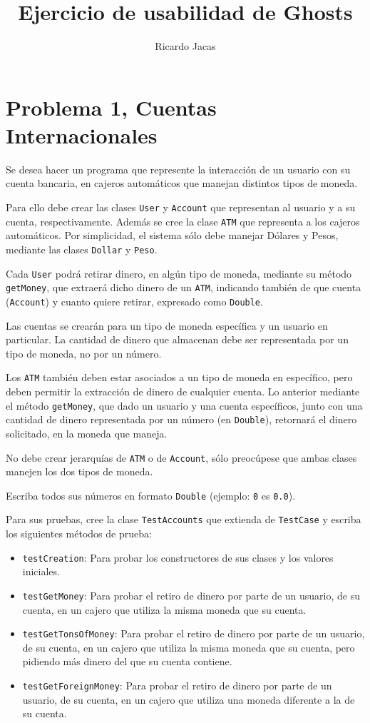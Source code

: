 \documentclass[11pt,spanish,letterpaper]{report}
\title{Ejercicio de usabilidad de Ghosts}
\author{Ricardo Jacas}
\begin{document}
\maketitle

\section*{Problema 1, Cuentas Internacionales}

Se desea hacer un programa que represente la interacción de un usuario con su cuenta bancaria, en cajeros automáticos que manejan distintos tipos de moneda.

Para ello debe crear las clases {\tt User} y {\tt Account} que representan al usuario y a su cuenta, respectivamente. Además se cree la clase {\tt ATM} que representa a los cajeros automáticos. Por simplicidad, el sistema sólo debe manejar Dólares y Pesos, mediante las clases {\tt Dollar} y {\tt Peso}.

Cada {\tt User} podrá retirar dinero, en algún tipo de moneda, mediante su método {\tt getMoney}, que extraerá dicho dinero de un {\tt ATM}, indicando también de que cuenta ({\tt Account}) y cuanto quiere retirar, expresado como {\tt Double}.

Las cuentas se crearán para un tipo de moneda específica y un usuario en particular. La cantidad de dinero que almacenan debe ser representada por un tipo de moneda, no por un número.

Los {\tt ATM} también deben estar asociados a un tipo de moneda en específico, pero deben permitir la extracción de dinero de cualquier cuenta. Lo anterior mediante el método {\tt getMoney}, que dado un usuario y una cuenta específicos, junto con una cantidad de dinero representada por un número (en  {\tt Double}), retornará el dinero solicitado, en la moneda que maneja.

No debe crear jerarquías de {\tt ATM} o de {\tt Account}, sólo preocúpese que ambas clases manejen los dos tipos de moneda.

Escriba todos sus números en formato {\tt Double} (ejemplo: \verb|0| es \verb|0.0|).

Para sus pruebas, cree la clase {\tt TestAccounts} que extienda de {\tt TestCase} y escriba los siguientes métodos de prueba:

\begin{itemize}
	\item {\tt testCreation}: Para probar los constructores de sus clases y los valores iniciales.
	\item {\tt testGetMoney}: Para probar el retiro de dinero por parte de un usuario, de su cuenta, en un cajero que utiliza la misma moneda que su cuenta.
	\item {\tt testGetTonsOfMoney}: Para probar el retiro de dinero por parte de un usuario, de su cuenta, en un cajero que utiliza la misma moneda que su cuenta, pero pidiendo más dinero del que su cuenta contiene.
	\item {\tt testGetForeignMoney}: Para probar el retiro de dinero por parte de un usuario, de su cuenta, en un cajero que utiliza una moneda diferente a la de su cuenta.
\end{itemize}
\newpage
\end{document}
